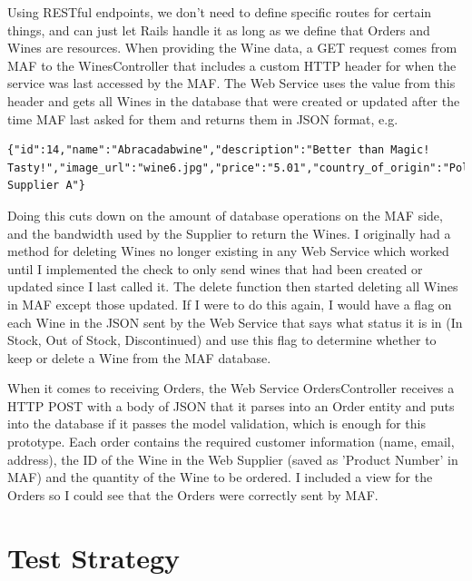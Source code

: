 \documentclass[12pt]{article}
\begin{document}
Using RESTful endpoints, we don't need to define specific routes for certain things, and can just let Rails handle it as long as we define that Orders and Wines are resources. When providing the Wine data, a GET request comes from MAF to the WinesController that includes a custom HTTP header for when the service was last accessed by the MAF. The Web Service uses the value from this header and gets all Wines in the database that were created or updated after the time MAF last asked for them and returns them in JSON format, e.g.
\begin{lstlisting}
{"id":14,"name":"Abracadabwine","description":"Better than Magic! Tasty!","image_url":"wine6.jpg","price":"5.01","country_of_origin":"Poland","grape_type":"Green","suitable_for_vegetarians":true,"bottle_size":"350ml","url":"http://localhost:3001/wines/14.json","supplier":"Wine Supplier A"}
\end{lstlisting}

Doing this cuts down on the amount of database operations on the MAF side, and the bandwidth used by the Supplier to return the Wines. I originally had a method for deleting Wines no longer existing in any Web Service which worked until I implemented the check to only send wines that had been created or updated since I last called it. The delete function then started deleting all Wines in MAF except those updated. If I were to do this again, I would have a flag on each Wine in the JSON sent by the Web Service that says what status it is in (In Stock, Out of Stock, Discontinued) and use this flag to determine whether to keep or delete a Wine from the MAF database.

When it comes to receiving Orders, the Web Service OrdersController receives a HTTP POST with a body of JSON that it parses into an Order entity and puts into the database if it passes the model validation, which is enough for this prototype. Each order contains the required customer information (name, email, address), the ID of the Wine in the Web Supplier (saved as 'Product Number' in MAF) and the quantity of the Wine to be ordered. I included a view for the Orders so I could see that the Orders were correctly sent by MAF.


\section{Test Strategy}
\end{document}
